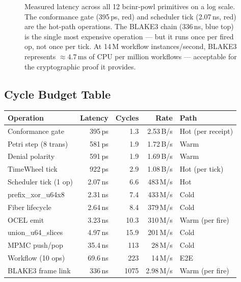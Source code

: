 \documentclass[12pt,a4paper]{article}
\theoremstyle{definition}
\theoremstyle{remark}
\begin{document}
\begin{figure}[h]
\caption{Measured latency across all 12 bcinr-powl primitives on a log scale.
The conformance gate (395\,ps, red) and scheduler tick (2.07\,ns, red) are the hot-path
operations.
The BLAKE3 chain (336\,ns, blue top) is the single most expensive operation ---
but it runs once per fired op, not once per tick.
At 14\,M workflow instances/second, BLAKE3 represents $\approx 4.7\,\text{ms}$ of CPU per
million workflows --- acceptable for the cryptographic proof it provides.}
\label{fig:latency_bar}
\end{figure}

\subsection{Cycle Budget Table}

\begin{center}
\renewcommand{\arraystretch}{1.12}
\begin{tabular}{lrrrl}
\toprule
\textbf{Operation} & \textbf{Latency} & \textbf{Cycles} & \textbf{Rate} & \textbf{Path} \\
\midrule
Conformance gate      & 395\,ps  &  1.3 & 2.53\,B/s  & Hot (per receipt) \\
Petri step (8 trans)  & 581\,ps  &  1.9 & 1.72\,B/s  & Warm \\
Denial polarity       & 591\,ps  &  1.9 & 1.69\,B/s  & Warm \\
TimeWheel tick        & 922\,ps  &  2.9 & 1.08\,B/s  & Hot (per tick) \\
Scheduler tick (1 op) & 2.07\,ns &  6.6 & 483\,M/s   & Hot \\
prefix\_xor\_u64x8    & 2.31\,ns &  7.4 & 433\,M/s   & Cold \\
Fiber lifecycle       & 2.64\,ns &  8.4 & 379\,M/s   & Cold \\
OCEL emit             & 3.23\,ns & 10.3 & 310\,M/s   & Warm (per fire) \\
union\_u64\_slices    & 4.97\,ns & 15.9 & 201\,M/s   & Cold \\
MPMC push/pop         & 35.4\,ns &  113 & 28\,M/s    & Cold \\
Workflow (10 ops)     & 69.6\,ns &  223 & 14\,M/s    & E2E \\
BLAKE3 frame link     & 336\,ns  & 1075 & 2.98\,M/s  & Warm (per fire) \\
\bottomrule
\end{tabular}
\end{center}
\end{document}
